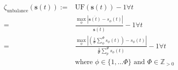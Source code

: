 \begin{equation}
	\begin{split}
		\zeta_\text{unbalance}(\textbf{s}(t)):=&\text{UF}(\textbf{s}(t)) - 1 \forall t\\
		=&\frac{\max_\phi\left|\overline{\textbf{s}(t)} - s_\phi(t)\right|}{\overline{\textbf{s}(t)}} - 1 \forall t\\
		=&\frac{\max_\phi\left|\left(\frac{1}{\Phi}\sum_\phi^\Phi{s_\phi(t)}\right) - s_\phi(t)\right|}{\frac{1}{\Phi}\sum_p^\Phi{s_\phi(t)}} - 1 \forall t\\
		&\text{where } \phi \in \{1, \dots \Phi\} \text{ and } \Phi \in \mathbb{Z}_{>0}
	\end{split}
	\label{ch1:equ:unbalance-cost}
\end{equation}
